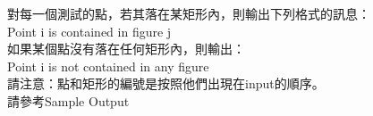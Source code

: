 對每一個測試的點，若其落在某矩形內，則輸出下列格式的訊息：
\\
Point i is contained in figure j
\\
如果某個點沒有落在任何矩形內，則輸出：
\\
Point i is not contained in any figure
\\
請注意：點和矩形的編號是按照他們出現在input的順序。\\
請參考Sample Output